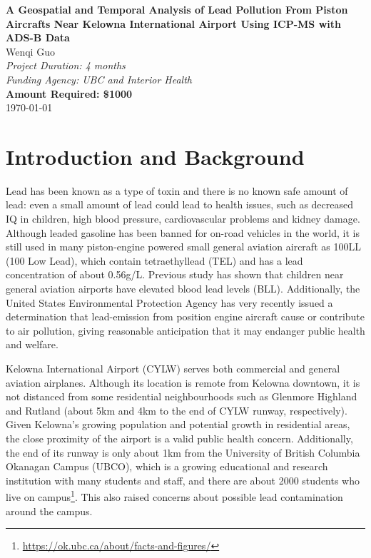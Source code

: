 \documentclass[12pt]{article}
\begin{document}
\begin{center}
    \Large{\textbf{A Geospatial and Temporal Analysis of Lead Pollution From Piston Aircrafts Near Kelowna International Airport Using ICP-MS with ADS-B Data}}\\
    \vspace{1cm}
    \large{Wenqi Guo}\\
    \vspace{0.5cm}
    \textit{Project Duration: 4 months}\\
    \vspace{0.5cm}
    \textit{Funding Agency: UBC and Interior Health}\\
    \vspace{0.5cm}
    \textbf{Amount Required: \$1000}\\
    \vspace{1cm}
    \vspace{1cm}
    \today
\end{center}
\newpage

\section{Introduction and Background}
Lead has been known as a type of toxin and there is no known safe amount of lead: even a small amount of lead could lead to health issues, such as decreased IQ in children, high blood pressure, cardiovascular problems and kidney damage. \cite{world_health_organization_lead_2023} Although leaded gasoline has been banned for on-road vehicles in the world, it is still used in many piston-engine powered small general aviation aircraft as 100LL (100 Low Lead), which contain tetraethyllead (TEL) and has a lead concentration of about 0.56g/L. 
\cite{noauthor_safety_2021} Previous study has shown that children near general aviation airports have elevated blood lead levels (BLL). \cite{miranda_geospatial_2011} \cite{zahran_leaded_2023} \cite{mills_lead_2022} \cite{zahran_effect_2017} Additionally, the United States Environmental Protection Agency has very recently issued a determination that lead-emission from position engine aircraft cause or contribute to air pollution, giving reasonable anticipation that it may endanger public health and welfare.  \cite{us_epa_epa_2023} 

Kelowna International Airport (CYLW) serves both commercial and general aviation airplanes. Although its location is remote from Kelowna downtown, it is not distanced from some residential neighbourhoods such as Glenmore Highland and Rutland (about 5km and 4km to the end of CYLW runway, respectively). Given Kelowna's growing population and potential growth in residential areas, the close proximity of the airport is a valid public health concern. Additionally, the end of its runway is only about 1km from the University of British Columbia Okanagan Campus (UBCO), which is a growing educational and research institution with many students and staff, and there are about 2000 students who live on campus\footnote{\url{https://ok.ubc.ca/about/facts-and-figures/}}. This also raised concerns about possible lead contamination around the campus.
\end{document}
